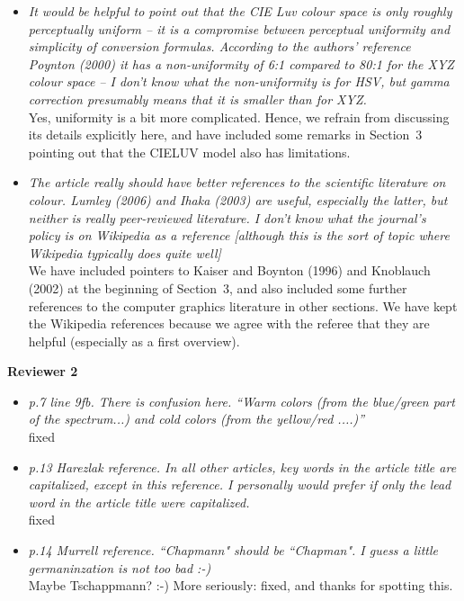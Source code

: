 \documentclass{wuletter}
\begin{document}
\begin{itemize}
  \item \textit{It would be helpful to point out that the CIE Luv colour
        space is only roughly perceptually uniform -- it is a compromise
	between perceptual uniformity and simplicity of conversion formulas.
	According to the authors' reference Poynton (2000) it has a non-uniformity
	of 6:1 compared to 80:1 for the XYZ colour space -- I don't know what the
	non-uniformity is for HSV, but gamma correction presumably means that it
	is smaller than for XYZ.}\\[-0.3cm]

        Yes, uniformity is a bit more complicated. Hence, we refrain from 
	discussing its details explicitly here, and have included some
	remarks in Section~3 pointing out that the CIELUV model also has
	limitations.
	
  \item \textit{The article really should have better references to the scientific
        literature on colour. Lumley (2006) and Ihaka (2003) are useful, especially
        the latter, but neither is really peer-reviewed literature.  I don't know
        what the journal's policy is on Wikipedia as a reference [although this is
        the sort of topic where Wikipedia typically does quite well]}\\[-0.3cm]
	
	We have included pointers to Kaiser and Boynton (1996) and Knoblauch (2002)
	at the beginning of Section~3, and also included some further references
	to the computer graphics literature in other sections. We have kept the
	Wikipedia references because we agree with the referee that they are
	helpful (especially as a first overview).
\end{itemize}


\textbf{Reviewer 2}

\begin{itemize}
  \item \textit{p.7 line 9fb. There is confusion here. ``Warm colors
        (from the blue/green part of the spectrum...) and cold colors
	(from the yellow/red ....)''}\\[-0.3cm]
	
	fixed
	
  \item \textit{p.13 Harezlak reference. In all other articles, key words in the article
        title are capitalized, except in this reference. I personally would prefer
        if only the lead word in the article title were capitalized.}\\[-0.3cm]
	
	fixed
	
  \item \textit{p.14 Murrell reference. ``Chapmann" should be ``Chapman". I guess a little
        germaninzation is not too bad :-)}\\[-0.3cm]
	
	Maybe Tschappmann? :-) More seriously: fixed, and thanks for spotting this.
\end{itemize}
\end{document}
